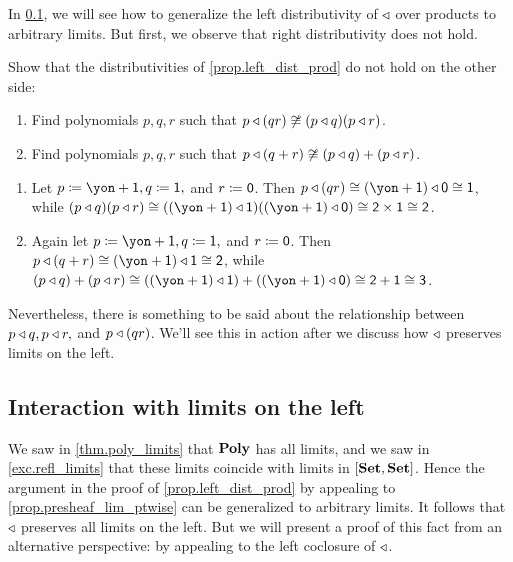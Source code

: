 \documentclass[Book-Poly]{subfiles}
\begin{document}
In \cref{subsec.comon.comp.prop.lim_left}, we will see how to generalize the left distributivity of $\mathbin{\triangleleft}$ over products to arbitrary limits.
But first, we observe that right distributivity does not hold.

\begin{exercise} \label{exc.right_not_dist_prod}
Show that the distributivities of \cref{prop.left_dist_prod} do not hold on the other side:
\begin{enumerate}
	\item \label{exc.right_not_dist_prod.prod} Find polynomials $p,q,r$ such that $p\mathbin{\triangleleft} (qr)\not\cong(p\mathbin{\triangleleft} q)(p\mathbin{\triangleleft} r)$.
	\item Find polynomials $p,q,r$ such that $p\mathbin{\triangleleft} (q+r)\not\cong(p\mathbin{\triangleleft} q)+(p\mathbin{\triangleleft} r)$.
\qedhere
\end{enumerate}
\begin{solution}
\begin{enumerate}
    \item Let $p \coloneqq \yon + \1, q \coloneqq \1,$ and $r \coloneqq \textsf{0}$.
    Then $p \tri (qr) \iso (\yon + \1) \tri \0 \iso \1$, while $(p \tri q)(p \tri r) \iso ((\yon + \1) \tri \1)((\yon + \1) \tri \0) \iso \2 \times \1 \iso \2$.
    \item Again let $p \coloneqq \yon + \1, q \coloneqq \1,$ and $r \coloneqq \textsf{0}$.
    Then $p \tri (q+r) \iso (\yon + \1) \tri \1 \iso \2$, while $(p \tri q)+(p \tri r) \iso ((\yon + \1) \tri \1)+((\yon + \1) \tri \0) \iso \2 + \1 \iso \3$.
\end{enumerate}
\end{solution}
\end{exercise}

Nevertheless, there is something to be said about the relationship between $p\mathbin{\triangleleft} q, p\mathbin{\triangleleft} r,$ and $p\mathbin{\triangleleft}(qr)$.
We'll see this in action after we discuss how $\mathbin{\triangleleft}$ preserves limits on the left.

\subsection{Interaction with limits on the left} \label{subsec.comon.comp.prop.lim_left}

We saw in \cref{thm.poly_limits} that $\mathbf{Poly}$ has all limits, and we saw in \cref{exc.refl_limits} that these limits coincide with limits in $[\mathbf{Set},\mathbf{Set}]$.
Hence the argument in the proof of \cref{prop.left_dist_prod} by appealing to \cref{prop.presheaf_lim_ptwise} can be generalized to arbitrary limits.
It follows that $\mathbin{\triangleleft}$ preserves all limits on the left.
But we will present a proof of this fact from an alternative perspective: by appealing to the left coclosure of $\mathbin{\triangleleft}$.
\end{document}
